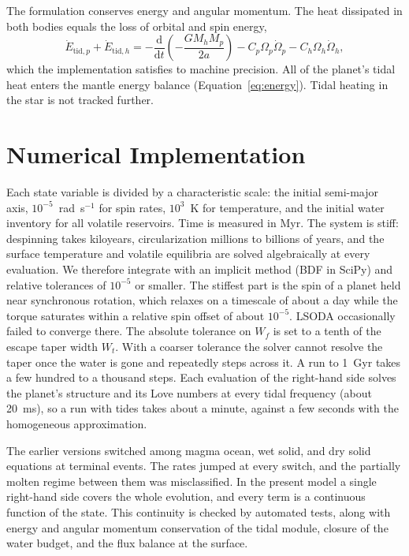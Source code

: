 \documentclass[11pt]{article}
\newcommand{\dd}{\mathrm{d}}
\begin{document}
The formulation conserves energy and angular momentum. The heat dissipated in both bodies equals the loss of orbital and spin energy,
\begin{equation}
\dot{E}_{\mathrm{tid},p} + \dot{E}_{\mathrm{tid},h} = -\frac{\dd}{\dd t}\left( -\frac{G M_h M_p}{2 a} \right)
- C_p \Omega_p \dot{\Omega}_p - C_h \Omega_h \dot{\Omega}_h,
\end{equation}
which the implementation satisfies to machine precision. All of the planet's tidal heat enters the mantle energy balance (Equation~\ref{eq:energy}). Tidal heating in the star is not tracked further.

\section{Numerical Implementation}\label{sec:numerics}

Each state variable is divided by a characteristic scale: the initial semi-major axis, $10^{-5}$~rad~s$^{-1}$ for spin rates, $10^3$~K for temperature, and the initial water inventory for all volatile reservoirs. Time is measured in Myr. The system is stiff: despinning takes kiloyears, circularization millions to billions of years, and the surface temperature and volatile equilibria are solved algebraically at every evaluation. We therefore integrate with an implicit method (BDF in SciPy) and relative tolerances of $10^{-5}$ or smaller. The stiffest part is the spin of a planet held near synchronous rotation, which relaxes on a timescale of about a day while the torque saturates within a relative spin offset of about $10^{-5}$. LSODA occasionally failed to converge there. The absolute tolerance on $W_f$ is set to a tenth of the escape taper width $W_t$. With a coarser tolerance the solver cannot resolve the taper once the water is gone and repeatedly steps across it. A run to 1~Gyr takes a few hundred to a thousand steps. Each evaluation of the right-hand side solves the planet's structure and its Love numbers at every tidal frequency (about 20~ms), so a run with tides takes about a minute, against a few seconds with the homogeneous approximation.

The earlier versions switched among magma ocean, wet solid, and dry solid equations at terminal events. The rates jumped at every switch, and the partially molten regime between them was misclassified. In the present model a single right-hand side covers the whole evolution, and every term is a continuous function of the state. This continuity is checked by automated tests, along with energy and angular momentum conservation of the tidal module, closure of the water budget, and the flux balance at the surface.
\end{document}
